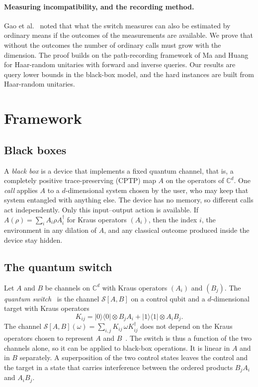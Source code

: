 \documentclass[11pt,letterpaper]{article}
\theoremstyle{definition}\newtheorem{definition}[theorem]{Definition}
\newcommand{\C}{\mathbb C}
\newcommand{\ket}[1]{\lvert#1\rangle}
\newcommand{\bra}[1]{\langle#1\rvert}
\newcommand{\proj}[1]{\ket{#1}\!\bra{#1}}
\newcommand{\SW}{\mathcal S}
\begin{document}
\paragraph{Measuring incompatibility, and the recording method.}
Gao et al.~\cite{gao2023} noted that what the switch measures can also
be estimated by ordinary means if the outcomes of the measurements are
available. We prove that without the outcomes the number of ordinary
calls must grow with the dimension. The proof builds on the
path-recording framework of Ma and Huang~\cite{mahuang2025} for
Haar-random unitaries with forward and inverse queries. Our results are
query lower bounds in the black-box model, and the hard instances are
built from Haar-random unitaries.

\section{Framework}\label{sec:framework}



\subsection{Black boxes}

A \emph{black box} is a device that implements a fixed quantum channel,
that is, a completely positive trace-preserving (CPTP) map $A$ on the
operators of $\C^d$. One \emph{call} applies $A$ to a $d$-dimensional
system chosen by the user, who may keep that system entangled with
anything else. The device has no memory, so different calls act
independently. Only this input--output action is available. If
$A(\rho)=\sum_iA_i\rho A_i^\dagger$ for Kraus operators $(A_i)$, then
the index $i$, the environment in any dilation of $A$, and any classical
outcome produced inside the device stay hidden.

\subsection{The quantum switch}

Let $A$ and $B$ be channels on $\C^d$ with Kraus operators $(A_i)$ and
$(B_j)$. The \emph{quantum switch}~\cite{chiribella2013} is the channel
$\SW[A,B]$ on a control qubit and a $d$-dimensional target with Kraus
operators
\begin{equation}\label{eq:switch}
 K_{ij}=\proj0\otimes B_jA_i+\proj1\otimes A_iB_j.
\end{equation}
The channel $\SW[A,B](\omega)=\sum_{i,j}K_{ij}\,\omega K_{ij}^\dagger$
does not depend on the Kraus operators chosen to represent $A$ and
$B$~\cite{chiribella2013}. The switch is thus a function of the two
channels alone, so it can be applied to black-box operations. It is
linear in $A$ and in $B$ separately. A superposition of the two
control states leaves the control and the target in a state that
carries interference between the ordered products $B_jA_i$ and
$A_iB_j$.
\end{document}
